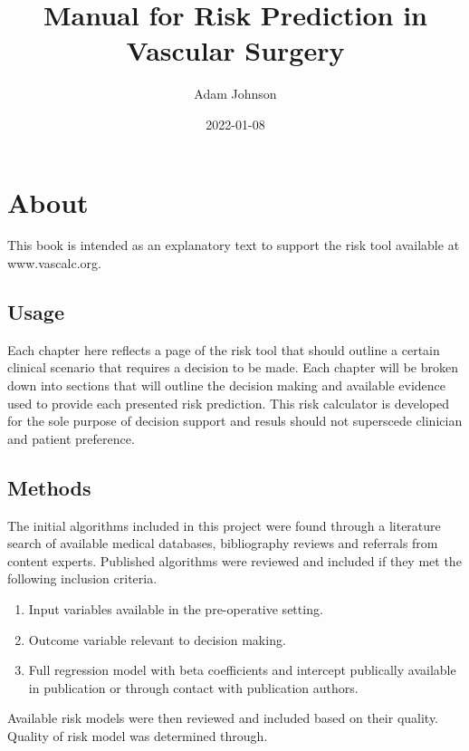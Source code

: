 \documentclass[
]{book}
\title{Manual for Risk Prediction in Vascular Surgery}
\author{Adam Johnson}
\date{2022-01-08}
\providecommand{\tightlist}{%
  \setlength{\itemsep}{0pt}\setlength{\parskip}{0pt}}
\begin{document}
\maketitle

{
\setcounter{tocdepth}{1}
\tableofcontents
}
\hypertarget{about}{%
\chapter{About}\label{about}}

This book is intended as an explanatory text to support the risk tool available at www.vascalc.org.

\hypertarget{usage}{%
\section{Usage}\label{usage}}

Each chapter here reflects a page of the risk tool that should outline a certain clinical scenario that requires a decision to be made. Each chapter will be broken down into sections that will outline the decision making and available evidence used to provide each presented risk prediction. This risk calculator is developed for the sole purpose of decision support and resuls should not superscede clinician and patient preference.

\hypertarget{methods}{%
\section{Methods}\label{methods}}

The initial algorithms included in this project were found through a literature search of available medical databases, bibliography reviews and referrals from content experts. Published algorithms were reviewed and included if they met the following inclusion criteria.

\begin{enumerate}
\def\labelenumi{\arabic{enumi}.}
\tightlist
\item
  Input variables available in the pre-operative setting.
\item
  Outcome variable relevant to decision making.
\item
  Full regression model with beta coefficients and intercept publically available in publication or through contact with publication authors.
\end{enumerate}

Available risk models were then reviewed and included based on their quality. Quality of risk model was determined through.
\end{document}
